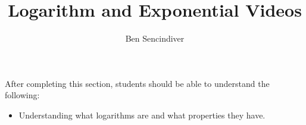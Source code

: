 \documentclass{ximera}
\title{Logarithm and Exponential Videos}
\author{Ben Sencindiver}
\begin{document}
\begin{abstract}
\end{abstract}

\maketitle

\begin{sectionOutcomes}
After completing this section, students should be able to understand the following:

\begin{itemize}
    \item Understanding what logarithms are and what properties they have.
\end{itemize}


\end{sectionOutcomes}
\end{document}
